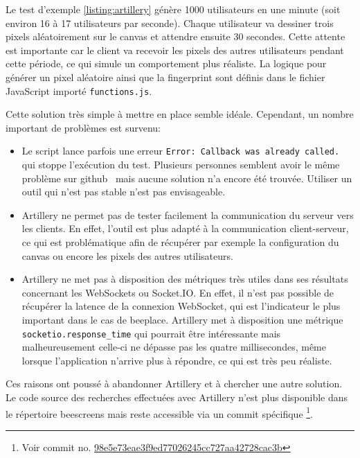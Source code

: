 Le test d'exemple \ref{listing:artillery} génère 1000 utilisateurs en une minute (soit environ 16 à 17 utilisateurs par seconde). Chaque utilisateur va dessiner trois pixels aléatoirement sur le canvas et attendre ensuite 30 secondes. Cette attente est importante car le client va recevoir les pixels des autres utilisateurs pendant cette période, ce qui simule un comportement plus réaliste. La logique pour générer un pixel aléatoire ainsi que la fingerprint sont définis dans le fichier JavaScript importé \texttt{functions.js}.

Cette solution très simple à mettre en place semble idéale. Cependant, un nombre important de problèmes est survenu:

\begin{itemize}
  \item Le script lance parfois une erreur \texttt{Error: Callback was already called.} qui stoppe l'exécution du test. Plusieurs personnes semblent avoir le même problème sur \gls{github}~\cite{artillery-callback-issue} mais aucune solution n'a encore été trouvée. Utiliser un outil qui n'est pas stable n'est pas envisageable.
  \item Artillery ne permet pas de tester facilement la communication du serveur vers les clients. En effet, l'outil est plus adapté à la communication client-serveur, ce qui est problématique afin de récupérer par exemple la configuration du canvas ou encore les pixels des autres utilisateurs.
  \item Artillery ne met pas à disposition des métriques très utiles dans ses résultats concernant les WebSockets ou Socket.IO. En effet, il n'est pas possible de récupérer la latence de la connexion WebSocket, qui est l'indicateur le plus important dans le cas de \gls{beeplace}. Artillery met à disposition une métrique \texttt{socketio.response\_time} qui pourrait être intéressante mais malheureusement celle-ci ne dépasse pas les quatre millisecondes, même lorsque l'application n'arrive plus à répondre, ce qui est très peu réaliste.
\end{itemize}

Ces raisons ont poussé à abandonner Artillery et à chercher une autre solution. Le code source des recherches effectuées avec Artillery n'est plus disponible dans le répertoire \gls{beescreens} mais reste accessible via un commit spécifique \footnote{Voir commit no. \href{https://gitlab.com/beescreens/beescreens/-/merge_requests/255/diffs?commit_id=98e5e73eae3f9ed77026245cc727aa42728cac3b}{98e5e73eae3f9ed77026245cc727aa42728cac3b}}.

